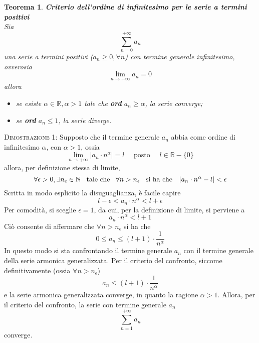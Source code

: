 \documentclass[a4paper]{extarticle}
\newtheorem{theorem}{Teorema}[section]
\begin{document}
\begin{theorem}\textbf{Criterio dell'ordine di infinitesimo per le serie a termini positivi}\\
    Sia
    \[\sum_{n=0}^{+\infty} a_n\]
    una serie a termini positivi ($a_n \geq 0, \forall n$) con termine generale infinitesimo, ovverosia
    \[\lim_{n \to +\infty} a_n = 0\]
    allora
    \begin{itemize}
        \item se esiste $\alpha \in \mathbb{R}, \alpha > 1$ tale che \textbf{ord} $a_n \geq \alpha$, la serie converge;
        \item se \textbf{ord} $a_n \leq 1$, la serie diverge.
    \end{itemize}
\end{theorem}

\vspace{2em}
\noindent
\normalfont \normalsize
\textsc{Dimostrazione 1}: Supposto che il termine generale $a_n$ abbia come ordine di infinitesimo $\alpha$, con $\alpha > 1$, ossia
\[\lim_{n \to + \infty} \left \vert a_n \cdot n^\alpha \right \vert = l \hspace{1em} \text{ posto } \hspace{1em} l \in \mathbb{R} - \{0\}\]
allora, per definizione stessa di limite,
\[\forall \epsilon > 0, \exists n_\epsilon \in \mathbb{N} \hspace{0.5em} \text{ tale che } \hspace{0.5em} \forall n > n_\epsilon \hspace{0.5em} \text{ si ha che } \hspace{0.5em} \left \vert a_n \cdot n^\alpha - l\right \vert < \epsilon\]
Scritta in modo esplicito la disuguaglianza, è facile capire
\[l-\epsilon < a_n \cdot n^\alpha < l+\epsilon\]
Per comodità, si sceglie $\epsilon = 1$, da cui, per la definizione di limite, si perviene a
\[a_n \cdot n^\alpha< l+1\]
Ciò consente di affermare che $\forall n > n_\epsilon$ si ha che
\[0 \leq a_n \leq (l+1) \cdot \frac{1}{n^\alpha}\]
In questo modo si sta confrontando il termine generale $a_n$ con il termine generale della serie armonica generalizzata. Per il criterio del confronto, siccome definitivamente (ossia $\forall n > n_\epsilon$)
\[a_n \leq (l+1) \cdot \frac{1}{n^\alpha}\]
e la serie armonica generalizzata converge, in quanto la ragione $\alpha > 1$. Allora, per il criterio del confronto, la serie con termine generale $a_n$
\[\sum_{n=1}^{+\infty} a_n\]
converge.
\end{document}
